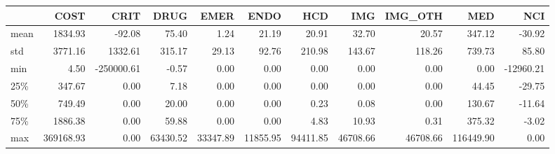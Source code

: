 \begin{tabular}{lrrrrrrrrrr}
\toprule
{} &       COST &       CRIT &      DRUG &      EMER &      ENDO &       HCD &       IMG &   IMG\_OTH &        MED &       NCI \\
\midrule
mean &    1834.93 &     -92.08 &     75.40 &      1.24 &     21.19 &     20.91 &     32.70 &     20.57 &     347.12 &    -30.92 \\
std  &    3771.16 &    1332.61 &    315.17 &     29.13 &     92.76 &    210.98 &    143.67 &    118.26 &     739.73 &     85.80 \\
min  &       4.50 & -250000.61 &     -0.57 &      0.00 &      0.00 &      0.00 &      0.00 &      0.00 &       0.00 & -12960.21 \\
25\%  &     347.67 &       0.00 &      7.18 &      0.00 &      0.00 &      0.00 &      0.00 &      0.00 &      44.45 &    -29.75 \\
50\%  &     749.49 &       0.00 &     20.00 &      0.00 &      0.00 &      0.23 &      0.08 &      0.00 &     130.67 &    -11.64 \\
75\%  &    1886.38 &       0.00 &     59.88 &      0.00 &      0.00 &      4.83 &     10.93 &      0.31 &     375.32 &     -3.02 \\
max  &  369168.93 &       0.00 &  63430.52 &  33347.89 &  11855.95 &  94411.85 &  46708.66 &  46708.66 &  116449.90 &      0.00 \\
\bottomrule
\end{tabular}
